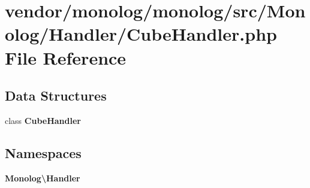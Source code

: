 \section{vendor/monolog/monolog/src/\+Monolog/\+Handler/\+Cube\+Handler.php File Reference}
\label{_cube_handler_8php}
\subsection*{Data Structures}
\begin{DoxyCompactItemize}
\item 
class {\bf Cube\+Handler}
\end{DoxyCompactItemize}
\subsection*{Namespaces}
\begin{DoxyCompactItemize}
\item 
 {\bf Monolog\textbackslash{}\+Handler}
\end{DoxyCompactItemize}
